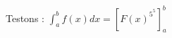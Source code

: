 \documentclass{article}
\newcommand{\hook}[3]{
		\left[ #1 \right]_#2^#3
	}
\begin{document}
	Testons : $ \displaystyle \int_{a}^{b}{f(x) dx} = \hook{F(x)^{5^5}}{a}{b} $
\end{document}
